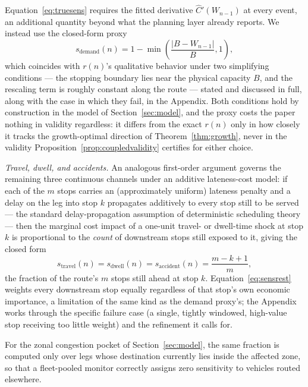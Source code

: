 \documentclass[trsc,dblanonrev]{informs4}
\begin{document}
Equation~\eqref{eq:truesens} requires the fitted derivative $\widehat
C'(W_{n-1})$ at every event, an additional quantity beyond what the
planning layer already reports. We instead use the closed-form proxy
\begin{equation}\label{eq:sensdemand}
s_{\mathrm{demand}}(n) = 1 - \min\!\left(\frac{|B - W_{n-1}|}{B}, 1\right),
\end{equation}
which coincides with $r(n)$'s qualitative behavior under two
simplifying conditions --- the stopping boundary lies near the
physical capacity $B$, and the rescaling term is roughly constant
along the route --- stated and discussed in full, along with the
case in which they fail, in the Appendix. Both conditions hold by
construction in the model of Section~\ref{sec:model}, and the proxy
costs the paper nothing in validity regardless: it differs from the
exact $r(n)$ only in how closely it tracks the growth-optimal
direction of Theorem~\ref{thm:growth}, never in the validity
Proposition~\ref{prop:coupledvalidity} certifies for either choice.

\emph{Travel, dwell, and accidents.} An analogous first-order argument
governs the remaining three continuous channels under an additive
lateness-cost model: if each of the $m$ stops carries an (approximately
uniform) lateness penalty and a delay on the leg into stop $k$
propagates additively to every stop still to be served --- the standard
delay-propagation assumption of deterministic scheduling theory --- then
the marginal cost impact of a one-unit travel- or dwell-time shock at
stop $k$ is proportional to the \emph{count} of downstream stops still
exposed to it, giving the closed form
\begin{equation}\label{eq:sensrest}
s_{\mathrm{travel}}(n) = s_{\mathrm{dwell}}(n) = s_{\mathrm{accident}}(n)
= \frac{m - k + 1}{m},
\end{equation}
the fraction of the route's $m$ stops still ahead at stop $k$. Equation~\eqref{eq:sensrest} weights every downstream stop equally
regardless of that stop's own economic importance, a limitation of
the same kind as the demand proxy's; the Appendix works through the
specific failure case (a single, tightly windowed, high-value stop
receiving too little weight) and the refinement it calls for.

For the zonal congestion pocket of Section~\ref{sec:model}, the same
fraction is computed only over legs whose destination currently lies
inside the affected zone, so that a fleet-pooled monitor correctly
assigns zero sensitivity to vehicles routed elsewhere.
\end{document}

